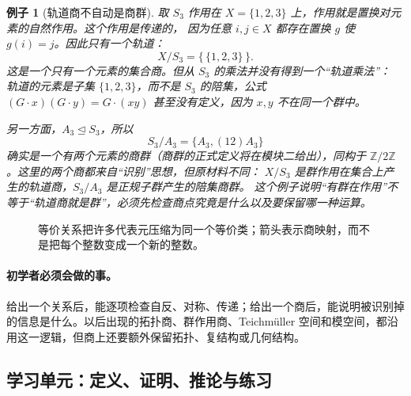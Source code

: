 \documentclass[UTF8,fontset=none,a4paper,11pt]{ctexart}
\theoremstyle{foundation-definition}
\theoremstyle{foundation-theorem}
\theoremstyle{foundation-proposition}
\theoremstyle{foundation-example}
\newtheorem{example}[definition]{例子}
\theoremstyle{foundation-remark}
\theoremstyle{foundation-theorem}
\begin{document}
\begin{example}[轨道商不自动是商群]\label{ex:orbit-not-quotient-group}
取 \(S_3\) 作用在 \(X=\{1,2,3\}\) 上，作用就是置换对元素的自然作用。这个作用是传递的，
因为任意 \(i,j\in X\) 都存在置换 \(g\) 使 \(g(i)=j\)。因此只有一个轨道：
\[
X/S_3=\bigl\{\,\{1,2,3\}\,\bigr\}.
\]
这是一个只有一个元素的集合商。但从 \(S_3\) 的乘法并没有得到一个“轨道乘法”：
轨道的元素是子集 \(\{1,2,3\}\)，而不是 \(S_3\) 的陪集，公式
\((G\cdot x)(G\cdot y)=G\cdot(xy)\) 甚至没有定义，因为 \(x,y\) 不在同一个群中。

另一方面，\(A_3\trianglelefteq S_3\)，所以
\[
S_3/A_3=\{A_3,(12)A_3\}
\]
确实是一个有两个元素的\emph{商群}（商群的正式定义将在模块二给出），同构于
\(\mathbb Z/2\mathbb Z\)。这里的两个商都来自“识别”思想，但原材料不同：
\(X/S_3\) 是群作用在集合上产生的轨道商，\(S_3/A_3\) 是正规子群产生的陪集商群。
这个例子说明“有群在作用”不等于“轨道商就是群”，必须先检查商点究竟是什么以及要保留哪一种运算。
\end{example}

\begin{figure}[htbp]
\centering
{}
\caption{等价关系把许多代表元压缩为同一个等价类；箭头表示商映射，而不是把每个整数变成一个新的整数。}
\label{fig:quotient-intuition}
\end{figure}

\paragraph{初学者必须会做的事。}
给出一个关系后，能逐项检查自反、对称、传递；给出一个商后，能说明被识别掉的信息是什么。以后出现的拓扑商、群作用商、Teichmüller 空间和模空间，都沿用这一逻辑，但商上还要额外保留拓扑、复结构或几何结构。

\subsection{学习单元：定义、证明、推论与练习}
\end{document}
